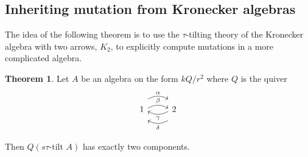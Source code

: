 \documentclass[]{article}
\theoremstyle{definition}
\newtheorem{theorem}{Theorem}[section]
\newcommand{\tu}{\ensuremath{\tau}}
\begin{document}
\subsection{Inheriting mutation from Kronecker algebras}
The idea of the following theorem is to use the \tu-tilting theory of the Kronecker algebra with two arrows, $K_2$, to explicitly compute mutations in a more complicated algebra.

\begin{theorem}\label{k2-reduction}
	Let $A$ be an algebra on the form $kQ/r^2$ where $Q$ is the quiver	
	\[\begin{tikzcd}
	1 
	\arrow[r,bend left,shift right = 0.5ex, "\beta"]
	\arrow[r,bend left, shift left = 2ex, "\alpha"]
	& 2 \arrow[l,bend left,shift right = 0.5ex,"\gamma"]
	\arrow[l,bend left,shift left = 2ex, "\delta"]  \\
		\end{tikzcd}
	\]
	
	Then $Q(s\tau\text{-tilt } A)$ has exactly two components.
		
\end{theorem}
\end{document}
